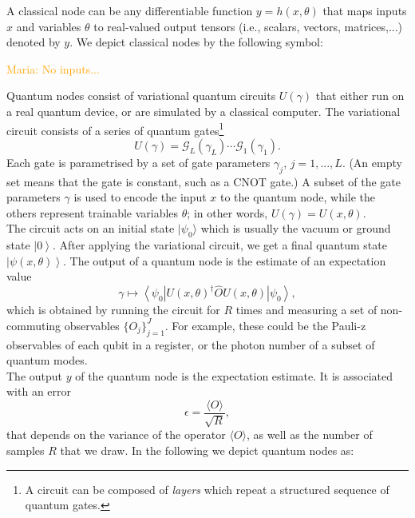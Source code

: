 \documentclass[aps,pra,10pt,twocolumn,groupedaddress,nofootinbib]{revtex4-1}
\theoremstyle{plain}
\newcommand{\ket}[1]{\ensuremath{\left| #1 \right \rangle}}
\newcommand{\bra}[1]{\ensuremath{\left \langle #1 \right |}}
\newcommand{\G}{\mathcal{G}}
\newcommand{\maria}[1]{\textcolor{orange}{Maria: #1}}
\begin{document}
A classical node can be any differentiable function $y = h(x, \theta)$ that maps inputs $x$ and variables $\theta$ to real-valued output tensors (i.e., scalars, vectors, matrices,...) denoted by $y$. We depict classical nodes by the following symbol:\\
\begin{figure}[h]
\centering
{}
\end{figure}
\maria{No inputs...}

Quantum nodes consist of variational quantum circuits $U(\gamma)$ that either run on a real quantum device, or are simulated by a classical computer. The variational circuit consists of a series of quantum gates\footnote{A circuit can be composed of \textit{layers} which repeat a structured sequence of quantum gates.} 
\[U(\gamma) = \G_{L}(\gamma_{L}) \cdots \G_1(\gamma_1). \]
Each gate is parametrised by a set of gate parameters
$\gamma_j$, $j=1,...,L$. (An empty set means that the gate is constant, such as a CNOT gate.) A subset of the gate parameters $\gamma$ is used to encode the input $x$ to the quantum node, while the others represent trainable variables $\theta$; in other words, $U(\gamma) = U(x, \theta)$. \\

The circuit acts on an initial state $|\psi_0 \rangle$ which is usually the vacuum or ground state $\ket{0}$. After applying the variational circuit, we get a final quantum state $\ket{\psi (x, \theta) }$. The output of a quantum node is the estimate of an expectation value 
\[\gamma \mapsto \bra{\psi_0} U(x, \theta)^{\dagger}  \hat{O} U(x, \theta) \ket{\psi_0},\]
which is obtained by running the circuit for $R$ times and measuring a set of non-commuting observables $\{O_j\}_{j=1}^J$. For example, these could be the Pauli-z observables of each qubit in a register, or the photon number of a subset of quantum modes. \\

The output $y$ of the quantum node is the expectation estimate. It is associated with an error
\[ \epsilon = \frac{\langle O \rangle}{\sqrt{R}}, \]
that depends on the variance of the operator $\langle O \rangle$, as well as the number of samples $R$ that we draw. In the following we depict quantum nodes as:\\
\begin{figure}[h]
\centering
{}
\end{figure}
\end{document}
